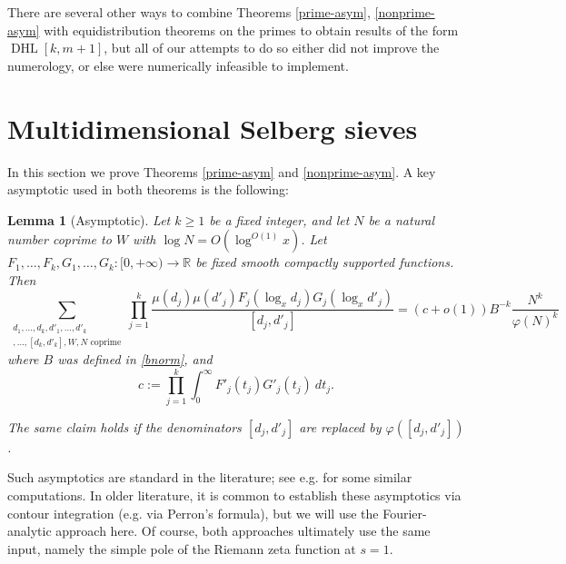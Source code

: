 \documentclass{bmcart}
\DeclareMathOperator*\DHL{DHL}
\theoremstyle{plain}
\newtheorem{lemma}[theorem]{Lemma}
\theoremstyle{definition}
\newcommand\R{\mathbb{R}}
\renewcommand{\phi}{\varphi}
\begin{document}
There are several other ways to combine Theorems \ref{prime-asym}, \ref{nonprime-asym} with equidistribution theorems on the primes to obtain results of the form $\DHL[k,m+1]$, but all of our attempts to do so either did not improve the numerology, or else were numerically infeasible to implement. 


\section{Multidimensional Selberg sieves}\label{sieving-sec}

In this section we prove Theorems \ref{prime-asym} and \ref{nonprime-asym}.  A key asymptotic used in both theorems is the following:

\begin{lemma}[Asymptotic]\label{mul-asym}  Let $k \geq 1$ be a fixed integer,
 and let $N$ be a natural number coprime to $W$ with $\log{N}=O(\log^{O(1)}{x})$. Let $F_1,\dots,F_k,G_1,\dots,G_k: [0,+\infty)\to \R$ be fixed smooth compactly supported functions.  Then
\begin{equation}\label{multisum}
 \sum_{\substack{d_1,\dots,d_k,d'_1,\dots,d'_k \\ [d_1,d'_1],\dots,[d_k,d'_k], W, N \text{ coprime}}} \prod_{j=1}^k \frac{\mu(d_j) \mu(d'_j) F_j( \log_x d_j ) G_j( \log_x d'_j)}{[d_j,d'_j]} = (c+o(1)) B^{-k}\frac{N^k}{\phi(N)^k}
\end{equation}
where $B$ was defined in \eqref{bnorm}, and
$$ c := \prod_{j=1}^k \int_0^\infty F'_j(t_j) G'_j(t_j)\ dt_j.$$

The same claim holds if the denominators $[d_j,d'_j]$ are replaced by $\phi([d_j,d'_j])$.
\end{lemma}

Such asymptotics are standard in the literature; see e.g. \cite{gy} for some similar computations.  In older literature, it is common to establish these asymptotics via contour integration (e.g. via Perron's formula), but we will use the Fourier-analytic approach here.  Of course, both approaches ultimately use the same input, namely the simple pole of the Riemann zeta function at $s=1$. 

\end{document}
